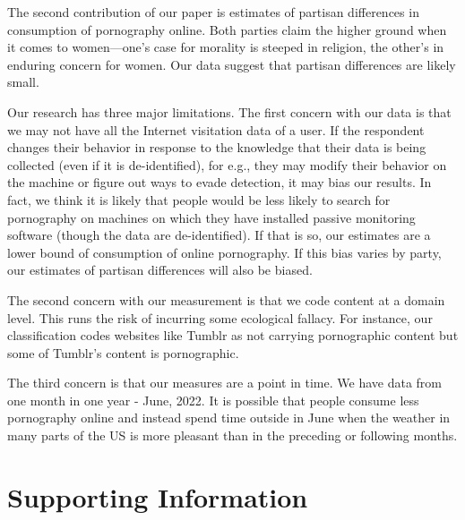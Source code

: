 \documentclass[12pt, letterpaper]{article}
\begin{document}
The second contribution of our paper is estimates of partisan differences in consumption of pornography online. Both parties claim the higher ground when it comes to women---one's case for morality is steeped in religion, the other's in enduring concern for women. Our data suggest that partisan differences are likely small.

Our research has three major limitations. The first concern with our data is that we may not have all the Internet visitation data of a user. If the respondent changes their behavior in response to the knowledge that their data is being collected (even if it is de-identified), for e.g., they may modify their behavior on the machine or figure out ways to evade detection, it may bias our results. In fact, we think it is likely that people would be less likely to search for pornography on machines on which they have installed passive monitoring software (though the data are de-identified). If that is so, our estimates are a lower bound of consumption of online pornography. If this bias varies by party, our estimates of partisan differences will also be biased. 

The second concern with our measurement is that we code content at a domain level. This runs the risk of incurring some ecological fallacy. For instance, our classification codes websites like Tumblr as not carrying pornographic content but some of Tumblr's content is pornographic. 

The third concern is that our measures are a point in time. We have data from one month in one year - June, 2022. It is possible that people consume less pornography online and instead spend time outside in June when the weather in many parts of the US is more pleasant than in the preceding or following months. 


\clearpage


\clearpage

\appendix
\renewcommand{\thesection}{SI \arabic{section}}
\renewcommand\thetable{\thesection.\arabic{table}}  
\renewcommand\thefigure{\thesection.\arabic{figure}}

\section{Supporting Information}\label{si}
\end{document}
